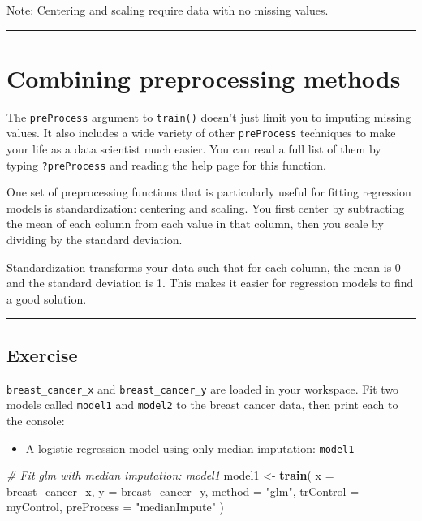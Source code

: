 \documentclass[]{book}
\newenvironment{Shaded}{\begin{snugshade}}{\end{snugshade}}
\newcommand{\KeywordTok}[1]{\textcolor[rgb]{0.13,0.29,0.53}{\textbf{#1}}}
\newcommand{\DataTypeTok}[1]{\textcolor[rgb]{0.13,0.29,0.53}{#1}}
\newcommand{\StringTok}[1]{\textcolor[rgb]{0.31,0.60,0.02}{#1}}
\newcommand{\CommentTok}[1]{\textcolor[rgb]{0.56,0.35,0.01}{\textit{#1}}}
\newcommand{\NormalTok}[1]{#1}
\providecommand{\tightlist}{%
  \setlength{\itemsep}{0pt}\setlength{\parskip}{0pt}}
\begin{document}
Note: Centering and scaling require data with no missing values.

\begin{center}\rule{0.5\linewidth}{\linethickness}\end{center}

\section{Combining preprocessing
methods}\label{combining-preprocessing-methods}

The \texttt{preProcess} argument to \texttt{train()} doesn't just limit
you to imputing missing values. It also includes a wide variety of other
\texttt{preProcess} techniques to make your life as a data scientist
much easier. You can read a full list of them by typing
\texttt{?preProcess} and reading the help page for this function.

One set of preprocessing functions that is particularly useful for
fitting regression models is standardization: centering and scaling. You
first center by subtracting the mean of each column from each value in
that column, then you scale by dividing by the standard deviation.

Standardization transforms your data such that for each column, the mean
is 0 and the standard deviation is 1. This makes it easier for
regression models to find a good solution.

\begin{center}\rule{0.5\linewidth}{\linethickness}\end{center}

\subsection*{Exercise}\label{exercise-25}

\texttt{breast\_cancer\_x} and \texttt{breast\_cancer\_y} are loaded in
your workspace. Fit two models called \texttt{model1} and
\texttt{model2} to the breast cancer data, then print each to the
console:

\begin{itemize}
\tightlist
\item
  A logistic regression model using only median imputation:
  \texttt{model1}
\end{itemize}

\begin{Shaded}
\begin{Highlighting}[]
\CommentTok{# Fit glm with median imputation: model1}
\NormalTok{model1 <-}\StringTok{ }\KeywordTok{train}\NormalTok{(}
  \DataTypeTok{x =}\NormalTok{ breast_cancer_x, }\DataTypeTok{y =}\NormalTok{ breast_cancer_y,}
  \DataTypeTok{method =} \StringTok{"glm"}\NormalTok{,}
  \DataTypeTok{trControl =}\NormalTok{ myControl,}
  \DataTypeTok{preProcess =} \StringTok{"medianImpute"}
\NormalTok{)}
\end{Highlighting}
\end{Shaded}
\end{document}
